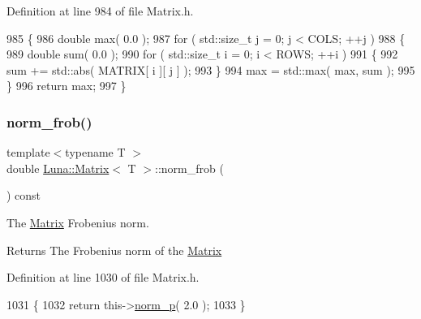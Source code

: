 Definition at line 984 of file Matrix.\+h.


\begin{DoxyCode}
985   \{
986     \textcolor{keywordtype}{double} max( 0.0 );
987     \textcolor{keywordflow}{for} ( std::size\_t j = 0; j < COLS; ++j )
988     \{
989         \textcolor{keywordtype}{double} sum( 0.0 );
990         \textcolor{keywordflow}{for} ( std::size\_t i = 0; i < ROWS; ++i )
991         \{
992             sum += std::abs( MATRIX[ i ][ j ] );
993         \}
994         max = std::max( max, sum );
995     \}
996     \textcolor{keywordflow}{return} max;
997   \}
\end{DoxyCode}
\mbox{\label{classLuna_1_1Matrix_a5c760c22fd59b5cb21a81ccb8468b6c2}} 
\subsubsection{\texorpdfstring{norm\+\_\+frob()}{norm\_frob()}}
{\footnotesize\ttfamily template$<$typename T $>$ \\
double \hyperlink{classLuna_1_1Matrix}{Luna\+::\+Matrix}$<$ T $>$\+::norm\+\_\+frob (\begin{DoxyParamCaption}{ }\end{DoxyParamCaption}) const\hspace{0.3cm}{\ttfamily [inline]}}



The \hyperlink{classLuna_1_1Matrix}{Matrix} Frobenius norm. 

\begin{DoxyReturn}{Returns}
The Frobenius norm of the \hyperlink{classLuna_1_1Matrix}{Matrix} 
\end{DoxyReturn}


Definition at line 1030 of file Matrix.\+h.


\begin{DoxyCode}
1031   \{
1032     \textcolor{keywordflow}{return} this->\hyperlink{classLuna_1_1Matrix_a95e7a5a0afb0abb419c4cfb8e1c27b57}{norm\_p}( 2.0 );
1033   \}
\end{DoxyCode}
\mbox{\label{classLuna_1_1Matrix_a9fb259d76d733da0bb722efe9ce9bcd2}} 
